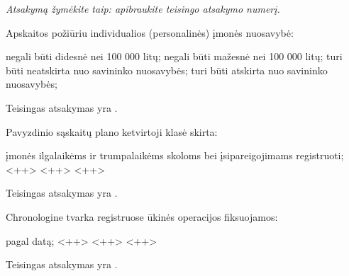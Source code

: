 \begin{tasks}

  \emph{Atsakymą žymėkite taip: apibraukite teisingo atsakymo numerį.}

  \begin{task}
    \begin{condition}
      Apskaitos požiūriu individualios (personalinės) įmonės nuosavybė:
      \begin{enumerate}
         negali būti didesnė nei 100 000 litų;
         negali būti mažesnė nei 100 000 litų;
         turi būti neatskirta nuo savininko nuosavybės;
         turi būti atskirta nuo savininko nuosavybės;
      \end{enumerate}
    \end{condition}
    \begin{solution}
      Teisingas atsakymas yra .
    \end{solution}
  \end{task}

  \begin{task}
    \begin{condition}
      Pavyzdinio sąskaitų plano ketvirtoji klasė skirta:
      \begin{enumerate}
         įmonės ilgalaikėms ir trumpalaikėms skoloms bei
          įsipareigojimams registruoti;
         <++>
         <++>
         <++>
      \end{enumerate}
    \end{condition}
    \begin{solution}
      Teisingas atsakymas yra .
    \end{solution}
  \end{task}

  \begin{task}
    \begin{condition}
      Chronologine tvarka registruose ūkinės operacijos fiksuojamos:
      \begin{enumerate}
         pagal datą;
         <++>
         <++>
         <++>
      \end{enumerate}
    \end{condition}
    \begin{solution}
      Teisingas atsakymas yra .
    \end{solution}
  \end{task}


\end{tasks}
